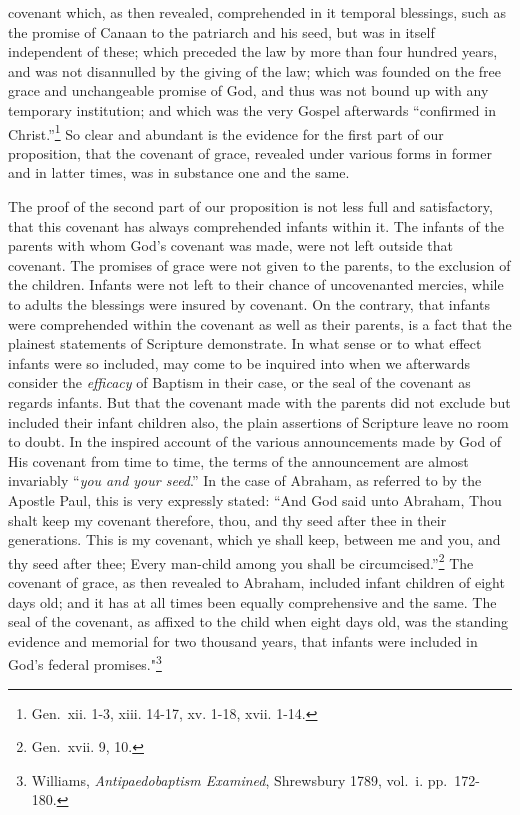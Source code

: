 \documentclass[english,]{book}
\begin{document}
covenant which, as then revealed, comprehended in it temporal blessings, such as the promise of Canaan to the patriarch and his seed, but was in itself independent of these; which preceded the law by more than four hundred years, and was not disannulled by the giving of the law; which was founded on the free grace and unchangeable promise of God, and thus was not bound up with any temporary institution; and which was the very Gospel afterwards ``confirmed in Christ.''\footnote{Gen.~xii. 1-3, xiii. 14-17, xv. 1-18, xvii. 1-14.} So clear and abundant is the evidence for the first part of our proposition, that the covenant of grace, revealed under various forms in former and in latter times, was in substance one and the same.

The proof of the second part of our proposition is not less full and satisfactory, that this covenant has always comprehended infants within it. The infants of the parents with whom God's covenant was made, were not left outside that covenant. The promises of grace were not given to the parents, to the exclusion of the children. Infants were not left to their chance of uncovenanted mercies, while to adults the blessings were insured by covenant. On the contrary, that infants were comprehended within the covenant as well as their parents, is a fact that the plainest statements of Scripture demonstrate. In what sense or to what effect infants were so included, may come to be inquired into when we afterwards consider the \emph{efficacy} of Baptism in their case, or the seal of the covenant as regards infants. But that the covenant made with the parents did not exclude but included their infant children also, the plain assertions of Scripture leave no room to doubt. In the inspired account of the various announcements made by God of His covenant from time to time, the terms of the announcement are almost invariably ``\emph{you and your seed}.'' In the case of Abraham, as referred to by the Apostle Paul, this is very expressly stated: ``And God said unto Abraham, Thou shalt keep my covenant therefore, thou, and thy seed after thee in their generations. This is my covenant, which ye shall keep, between me and you, and thy seed after thee; Every man-child among you shall be circumcised.''\footnote{Gen.~xvii. 9, 10.} The covenant of grace, as then revealed to Abraham, included infant children of eight days old; and it has at all times been equally comprehensive and the same. The seal of the covenant, as affixed to the child when eight days old, was the standing evidence and memorial for two thousand years, that infants were included in God's federal promises."\footnote{Williams, \emph{Antipaedobaptism Examined}, Shrewsbury 1789, vol.~i. pp.~172- 180.}
\end{document}
